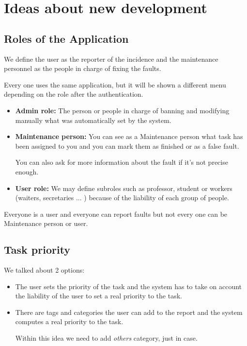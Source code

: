\section{Ideas about new development}

\subsection{Roles of the Application}

We define the user as the reporter of the incidence and the maintenance personnel as the people in charge of fixing the faults.

Every one uses the same application, but it will be shown a different menu depending on the role after the authentication.

\begin{itemize}
\item \textbf{Admin role: } The person or people in charge of banning and modifying manually what was automatically set by the system.

\item\textbf{Maintenance person:} You can see as a Maintenance person what task has been assigned to you and you can mark them as finished or as a false fault.

You can also ask for more information about the fault if it's not precise enough.

\item \textbf{User role: }  We may define subroles such as professor, student or workers (waiters, secretaries ... ) because of the liability of each group of people.

\end{itemize}

Everyone is a user and everyone can report faults but not  every one can be Maintenance person or user.

\subsection{Task priority}
We talked about 2 options:

\begin{itemize}
\item The user sets the priority of the task and the system has to take on account the liability of the user to set a real priority to the task.

\item There are tags and categories the user can add to the report and the system computes a real priority to the task.

Within this idea we need to add \textit{others} category, just in case.
\end{itemize}

